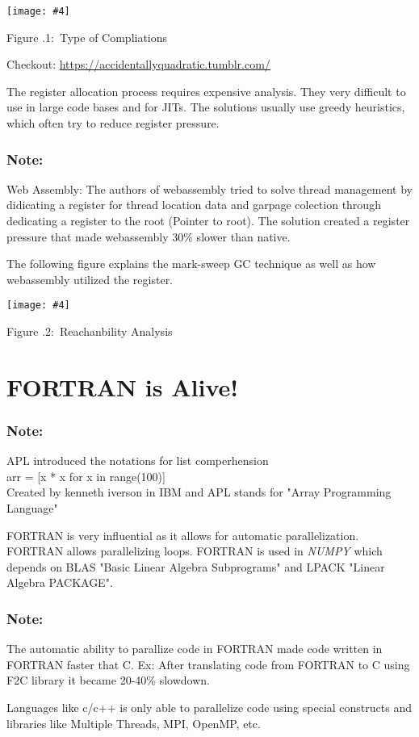 \documentclass[twoside]{article}
\newcounter{lecnum}
\newcommand{\fig}[4]{
            \centerline{\texttt{[image: \#4]}}
            \begin{center}
            Figure \thelecnum.#1:~#3
            \end{center}
    }
\begin{document}
\fig{1}{0.6}{Type of Compliations}{jit.drawio.png}

Checkout: \url{https://accidentallyquadratic.tumblr.com/}


The register allocation process requires expensive analysis. They very difficult to use in large code bases and for JITs. The solutions usually use greedy heuristics, which often try to reduce register pressure.


\subsubsection*{Note:}
Web Assembly: The authors of webassembly tried to solve thread management by didicating a register for thread location data and garpage colection through dedicating a register to the root (Pointer to root). The solution created a register pressure that made webassembly 30\% slower than native.


The following figure explains the mark-sweep GC technique as well as how webassembly utilized the register.
\fig{2}{0.6}{Reachanbility Analysis}{reachabilityanalysis.drawio.png}


\section{FORTRAN is Alive!}
\subsubsection*{Note:}
APL introduced the notations for list comperhension \\
    arr = [x * x for x in range(100)] \\
    Created by kenneth iverson in IBM and APL stands for "Array Programming Language"

FORTRAN is very influential as it allows for automatic parallelization.
FORTRAN allows parallelizing loops. FORTRAN is used in {\it NUMPY} which depends on BLAS "Basic Linear Algebra Subprograms" and LPACK "Linear Algebra PACKAGE".  
\subsubsection*{Note:}
The automatic ability to parallize code in FORTRAN made code written in FORTRAN faster that C. Ex: After translating code from FORTRAN to C using F2C library it became 20-40\% slowdown.  

Languages like c/c++ is only able to parallelize code using special constructs and libraries like Multiple Threads, MPI, OpenMP, etc.
\end{document}
